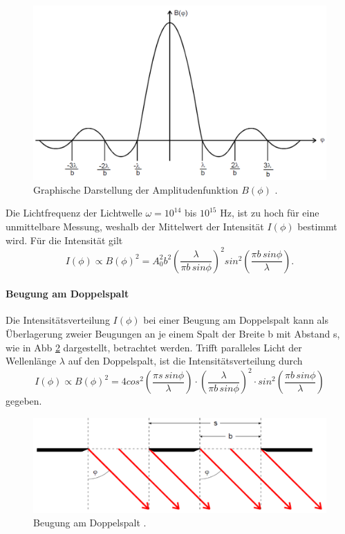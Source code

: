 \begin{figure}[H]
    \centering
    \includegraphics{Funktion.png}
    \caption{Graphische Darstellung der Amplitudenfunktion $B(\phi)$ \cite{V406}.}
    \label{fig:b}
\end{figure}
Die Lichtfrequenz der Lichtwelle $\omega = 10^14$ bis $10^15$ Hz, ist zu hoch für eine unmittelbare Messung, 
weshalb der Mittelwert der Intensität $I(\phi)$ bestimmt wird. Für die Intensität gilt 
\begin{equation}
    \label{eq:6}
    I(\phi) \propto B(\phi)^2 = A_0^2 b^2 \left(\frac{\lambda}{\pi b \, sin \phi}\right)^2 sin^2 \left(\frac{\pi b \, sin \phi}{\lambda}\right)  .
\end{equation}

\paragraph{Beugung am Doppelspalt}
Die Intensitätsverteilung $I(\phi)$ bei einer Beugung am Doppelspalt kann als Überlagerung zweier Beugungen an je 
einem Spalt der Breite b mit Abstand s, wie in Abb \ref{fig:c} dargestellt, betrachtet werden.
Trifft paralleles Licht der Wellenlänge $\lambda$ auf den Doppelspalt, ist die Intensitätsverteilung durch 
\begin{equation}
    \label{eq:7}
    I(\phi) \propto B(\phi)^2 = 4 cos^2\left(\frac{\pi s \, sin \phi}{\lambda}\right) \cdot \left(\frac{\lambda}{\pi b \, sin \phi}\right)^2 \cdot sin^2 \left(\frac{\pi b \, sin \phi}{\lambda}\right)
\end{equation}
gegeben.
\begin{figure}[H]
    \centering
    \includegraphics{Doppelspalt.png}
    \caption{Beugung am Doppelspalt \cite{V406}.}
    \label{fig:c}
\end{figure}

